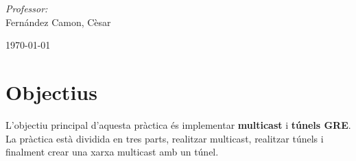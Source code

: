 \documentclass[10pt]{article}
\begin{document}
\begin{center}
\begin{minipage}{0.46\textwidth}
\begin{flushleft}
\end{flushleft}                                                                     %
\end{minipage}      
\begin{minipage}{0.52\textwidth}        
\vspace{-0.6cm}                                         %
\begin{flushright} \large                                                           %
\emph{Professor:} \\                                                                 %
Fernández Camon, Cèsar                                                    %
\end{flushright}                                                                    %
\end{minipage}  
\vspace*{1cm}
    

\begin{center}                                                                                  
{\large \today}                                                                 %
            \end{center}                                                                        
\end{center}                                                                        
                                                                                    
\newpage                                                                        

\tableofcontents
\listoffigures 

\newpage
\section{Objectius}
L'objectiu principal d'aquesta pràctica és implementar \textbf{multicast} i \textbf{túnels GRE}. La pràctica està dividida en tres parts, realitzar multicast, realitzar túnels i finalment crear una xarxa multicast amb un túnel.
\end{document}
